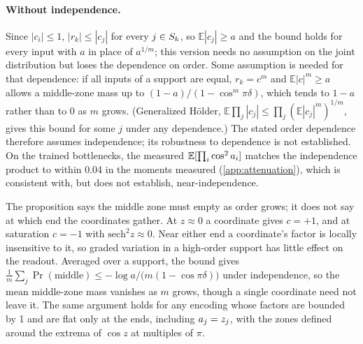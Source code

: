 \paragraph{Without independence.} Since $|c_i|\le1$, $|r_k|\le|c_j|$ for every $j\in S_k$, so
$\mathbb{E}|c_j|\ge a$ and the bound holds for every input with $a$ in place of $a^{1/m}$; this
version needs no assumption on the joint distribution but loses the dependence on order. Some
assumption is needed for that dependence: if all inputs of a support are equal, $r_k=c^m$ and
$\mathbb{E}|c|^m\ge a$ allows a middle-zone mass up to $(1-a)/(1-\cos^m\pi\delta)$, which tends to
$1-a$ rather than to 0 as $m$ grows. (Generalized H\"older,
$\mathbb{E}\prod_j|c_j|\le\prod_j(\mathbb{E}|c_j|^m)^{1/m}$, gives this bound for some $j$ under any
dependence.) The stated order dependence therefore assumes independence; its robustness to dependence is not established. On the trained bottlenecks, the measured $\mathbb{E}[\prod_i\cos^2a_{i}]$ matches the independence
product to within 0.04 in the moments measured (\cref{app:attenuation}), which is consistent with, but does not establish, near-independence.

The proposition says the middle zone must empty as order grows; it does not say at which end the
coordinates gather. At $z\approx0$ a coordinate gives $c=+1$, and at saturation $c=-1$ with
$\mathrm{sech}^2z\approx0$. Near either end a coordinate's factor is locally insensitive to it, so graded variation in a high-order support has little effect on the readout. Averaged over a support, the bound gives $\frac1m\sum_j\Pr(\text{middle})\le-\log a/\big(m(1-\cos\pi\delta)\big)$ under independence, so the mean middle-zone mass vanishes as $m$ grows, though a single coordinate need not leave it. The same argument
holds for any encoding whose factors are bounded by 1 and are flat only at the ends, including $a_{j}=z_j$, with the zones defined around the extrema of $\cos z$ at multiples of $\pi$.

